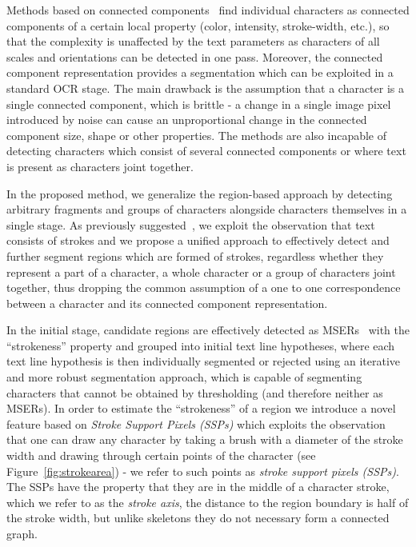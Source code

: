 \documentclass[conference]{IEEEtran}
\begin{document}
Methods based on connected components~\cite{MicrosoftCVPR,Neumann-ACCV10,Yao-CVPR2012,Neumann-CVPR2012, Shi2013107, Neumann-ICDAR2013} find individual characters as connected components of a certain local property (color, intensity, stroke-width, etc.), so that the complexity is unaffected by the text parameters as characters of all scales and orientations can be detected in one pass. Moreover, the connected component representation provides a segmentation which can be exploited in a standard OCR stage. The main drawback is the assumption that a character is a single connected component, which is brittle - a change in a single image pixel introduced by noise can cause an unproportional change in the connected component size, shape or other properties. The methods are also incapable of detecting characters which consist of several connected components or where text is present as characters joint together.

In the proposed method, we generalize the region-based approach by detecting arbitrary fragments and groups of characters alongside characters themselves in a single stage. As previously suggested~\cite{MicrosoftCVPR}, we exploit the observation that text consists of strokes and we propose a unified approach to effectively detect and further segment regions which are formed of strokes, regardless whether they represent a part of a character, a whole character or a group of characters joint together, thus dropping the common assumption of a one to one correspondence between a character and its connected component representation.

In the initial stage, candidate regions are effectively detected as MSERs~\cite{Matas-MSER} with the ``strokeness'' property and grouped into initial text line hypotheses, where each text line hypothesis is then individually segmented or rejected using an iterative and more robust segmentation approach, which is capable of segmenting characters that cannot be obtained by thresholding (and therefore neither as MSERs). In order to estimate the ``strokeness'' of a region we introduce a novel feature based on \emph{Stroke Support Pixels (SSPs)} which exploits the observation that one can draw any character by taking a brush with a diameter of the stroke width and drawing through certain points of the character (see Figure~\ref{fig:strokearea}) - we refer to such points as \emph{stroke support pixels (SSPs)}. The SSPs have the property that they are in the middle of a character stroke, which we refer to as the \emph{stroke axis}, the distance to the region boundary is half of the stroke width, but unlike skeletons they do not necessary form a connected graph.
\end{document}

